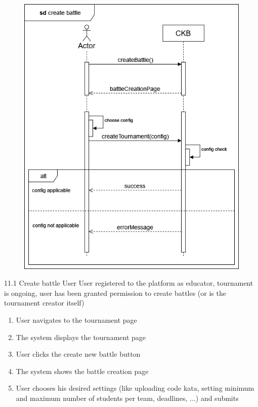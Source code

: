 \usecase
{
    \begin{figure}[H]
        \centering
        \includegraphics[width=\textwidth]{src/sd_diagrams/createbattle.png}
    \end{figure}
}
{11.1}
{Create battle} %
{User} %
{User registered to the platform as educator, tournament is ongoing, user has been granted permission to create battles (or is the tournament creator itself)} %
{ %
    \begin{enumerate}
        \item User navigates to the tournament page
        \item The system displays the tournament page
        \item User clicks the create new battle button
        \item The system shows the battle creation page
        \item User chooses his desired settings (like uploading code kata,            setting minimum and maximum number of students per team,                deadlines, ...) and submits
    \end{enumerate}
}
